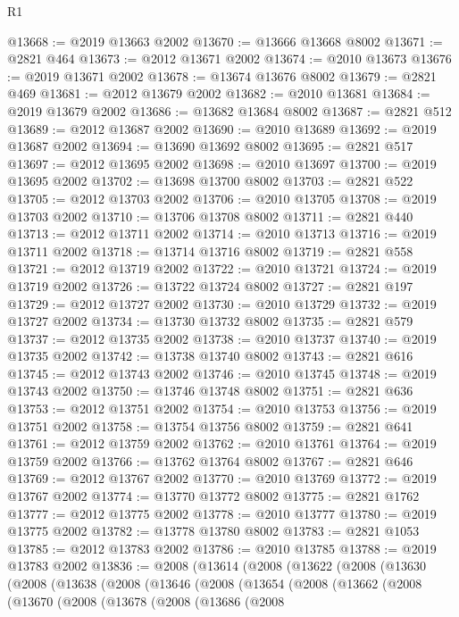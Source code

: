 \begin{lexlean}{R1}
\begin{coremodule}
@13668 := @2019 @13663 @2002
@13670 := @13666 @13668 @8002
@13671 := @2821 @464
@13673 := @2012 @13671 @2002
@13674 := @2010 @13673
@13676 := @2019 @13671 @2002
@13678 := @13674 @13676 @8002
@13679 := @2821 @469
@13681 := @2012 @13679 @2002
@13682 := @2010 @13681
@13684 := @2019 @13679 @2002
@13686 := @13682 @13684 @8002
@13687 := @2821 @512
@13689 := @2012 @13687 @2002
@13690 := @2010 @13689
@13692 := @2019 @13687 @2002
@13694 := @13690 @13692 @8002
@13695 := @2821 @517
@13697 := @2012 @13695 @2002
@13698 := @2010 @13697
@13700 := @2019 @13695 @2002
@13702 := @13698 @13700 @8002
@13703 := @2821 @522
@13705 := @2012 @13703 @2002
@13706 := @2010 @13705
@13708 := @2019 @13703 @2002
@13710 := @13706 @13708 @8002
@13711 := @2821 @440
@13713 := @2012 @13711 @2002
@13714 := @2010 @13713
@13716 := @2019 @13711 @2002
@13718 := @13714 @13716 @8002
@13719 := @2821 @558
@13721 := @2012 @13719 @2002
@13722 := @2010 @13721
@13724 := @2019 @13719 @2002
@13726 := @13722 @13724 @8002
@13727 := @2821 @197
@13729 := @2012 @13727 @2002
@13730 := @2010 @13729
@13732 := @2019 @13727 @2002
@13734 := @13730 @13732 @8002
@13735 := @2821 @579
@13737 := @2012 @13735 @2002
@13738 := @2010 @13737
@13740 := @2019 @13735 @2002
@13742 := @13738 @13740 @8002
@13743 := @2821 @616
@13745 := @2012 @13743 @2002
@13746 := @2010 @13745
@13748 := @2019 @13743 @2002
@13750 := @13746 @13748 @8002
@13751 := @2821 @636
@13753 := @2012 @13751 @2002
@13754 := @2010 @13753
@13756 := @2019 @13751 @2002
@13758 := @13754 @13756 @8002
@13759 := @2821 @641
@13761 := @2012 @13759 @2002
@13762 := @2010 @13761
@13764 := @2019 @13759 @2002
@13766 := @13762 @13764 @8002
@13767 := @2821 @646
@13769 := @2012 @13767 @2002
@13770 := @2010 @13769
@13772 := @2019 @13767 @2002
@13774 := @13770 @13772 @8002
@13775 := @2821 @1762
@13777 := @2012 @13775 @2002
@13778 := @2010 @13777
@13780 := @2019 @13775 @2002
@13782 := @13778 @13780 @8002
@13783 := @2821 @1053
@13785 := @2012 @13783 @2002
@13786 := @2010 @13785
@13788 := @2019 @13783 @2002
@13836 := @2008
    (@13614
      (@2008
        (@13622
          (@2008
            (@13630
              (@2008
                (@13638
                  (@2008
                    (@13646
                      (@2008
                        (@13654
                          (@2008
                            (@13662
                              (@2008
                                (@13670
                                  (@2008
                                    (@13678
                                      (@2008
                                        (@13686
                                          (@2008

\end{coremodule}
\end{lexlean}
